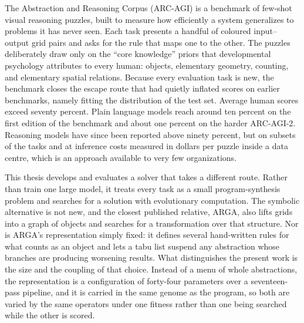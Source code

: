 
The Abstraction and Reasoning Corpus (ARC-AGI) is a benchmark of few-shot visual reasoning
puzzles, built to measure how efficiently a system generalizes to problems it has never
seen. Each task presents a handful of coloured input--output grid pairs and asks for the
rule that maps one to the other. The puzzles deliberately draw only on the ``core
knowledge'' priors that developmental psychology attributes to every human: objects,
elementary geometry, counting, and elementary spatial relations. Because every evaluation
task is new, the benchmark closes the escape route that had quietly inflated scores on
earlier benchmarks, namely fitting the distribution of the test set. Average human scores
exceed seventy percent. Plain language models reach around ten percent on the first
edition of the benchmark and about one percent on the harder ARC-AGI-2. Reasoning models
have since been reported above ninety percent, but on subsets of the tasks and at inference
costs measured in dollars per puzzle inside a data centre, which is an approach available
to very few organizations.

This thesis develops and evaluates a solver that takes a different route. Rather than train
one large model, it treats every task as a small program-synthesis problem and searches for
a solution with evolutionary computation. The symbolic alternative is not new, and the
closest published relative, ARGA, also lifts grids into a graph of objects and searches for
a transformation over that structure. Nor is ARGA's representation simply fixed: it defines
several hand-written rules for what counts as an object and lets a tabu list suspend any
abstraction whose branches are producing worsening results. What distinguishes the present work is
the size and the coupling of that choice. Instead of a menu of whole abstractions, the
representation is a configuration of forty-four parameters over a seventeen-pass pipeline,
and it is carried in the same genome as the program, so both are varied by the same
operators under one fitness rather than one being searched while the other is scored.

